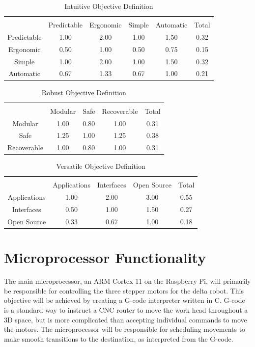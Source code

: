 \documentclass[11pt]{report}
\begin{document}
\begin{table}[ht] 
	\caption{Intuitive Objective Definition}
	\label{table:intuitive}
	\centering 
	\begin{tabular}{c c c c c c} 
		\hline\hline \\
		 			& Predictable	& Ergonomic	& Simple 		& Automatic 	& Total\\ 
		Predictable 	& 1.00 		& 2.00 		& 1.00 		& 1.50 		& 0.32 \\ 
		Ergonomic		& 0.50 		& 1.00 		& 0.50		& 0.75 		& 0.15 \\ 
		Simple	 	& 1.00 		& 2.00 		& 1.00 		& 1.50 		& 0.32 \\ 
		Automatic	 	& 0.67		& 1.33 		& 0.67 		& 1.00 		& 0.21 \\ 
	\end{tabular} 
\end{table}

\begin{table}[ht] 
	\caption{Robust Objective Definition}
	\label{table:robust}
	\centering 
	\begin{tabular}{c c c c c} 
		\hline\hline \\
		 			& Modular 	& Safe 		& Recoverable	& Total\\ 
		Modular	 	& 1.00 		& 0.80		& 1.00 		& 0.31 \\ 
		Safe 		& 1.25		& 1.00 		& 1.25		& 0.38 \\ 
		Recoverable 	& 1.00 		& 0.80 		& 1.00 		& 0.31 \\ 
	\end{tabular} 
\end{table}

\begin{table}[ht] 
	\caption{Versatile Objective Definition}
	\label{table:versatile}
	\centering 
	\begin{tabular}{c c c c c} 
		\hline\hline \\
		 			& Applications& Interfaces	& Open Source	& Total\\ 
		Applications	& 1.00 		& 2.00		& 3.00 		& 0.55 \\ 
		Interfaces	& 0.50		& 1.00 		& 1.50		& 0.27 \\ 
		Open Source 	& 0.33 		& 0.67 		& 1.00 		& 0.18 \\ 
	\end{tabular} 
\end{table}

\section{Microprocessor Functionality}
The main microprocessor, an ARM Cortex 11 on the Raspberry Pi, will primarily be responsible for controlling the three stepper motors for the delta robot.
This objective will be achieved by creating a G-code interpreter written in C.
G-code is a standard way to instruct a CNC router to move the work head throughout a 3D space, but is more complicated than accepting individual commands to move the motors.
The microprocessor will be responsible for scheduling movements to make smooth transitions to the destination, as interpreted from the G-code.
\end{document}
